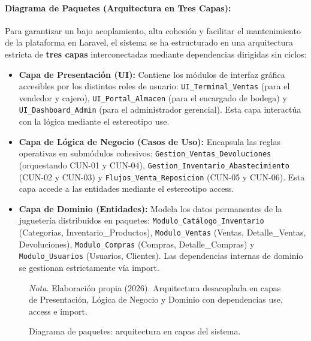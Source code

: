 \documentclass[12pt,a4paper]{article}
\begin{document}
\paragraph{Diagrama de Paquetes (Arquitectura en Tres Capas):}
Para garantizar un bajo acoplamiento, alta cohesi\'on y facilitar el mantenimiento de la plataforma en Laravel, el sistema se ha estructurado en una arquitectura estricta de \textbf{tres capas} interconectadas mediante dependencias dirigidas sin ciclos:
\begin{itemize}\sloppy
    \item \textbf{Capa de Presentaci\'on (UI):} Contiene los m\'odulos de interfaz gr\'afica accesibles por los distintos roles de usuario: \texttt{UI\_Terminal\_Ventas} (para el vendedor y cajero), \texttt{UI\_Portal\_Almacen} (para el encargado de bodega) y \texttt{UI\_Dashboard\_Admin} (para el administrador gerencial). Esta capa interact\'ua con la l\'ogica mediante el estereotipo \guillemotleft use\guillemotright.
    \item \textbf{Capa de L\'ogica de Negocio (Casos de Uso):} Encapsula las reglas operativas en subm\'odulos cohesivos: \texttt{Gestion\_Ventas\_Devoluciones} (orquestando CUN-01 y CUN-04), \texttt{Gestion\_Inventario\_Abastecimiento} (CUN-02 y CUN-03) y \texttt{Flujos\_Venta\_Reposicion} (CUN-05 y CUN-06). Esta capa accede a las entidades mediante el estereotipo \guillemotleft access\guillemotright.
    \item \textbf{Capa de Dominio (Entidades):} Modela los datos permanentes de la jugueter\'ia distribuidos en paquetes: \texttt{Modulo\_Cat\'alogo\_Inventario} (Categorias, Inventario\_Productos), \texttt{Modulo\_Ventas} (Ventas, Detalle\_Ventas, Devoluciones), \texttt{Modulo\_Compras} (Compras, Detalle\_Compras) y \texttt{Modulo\_Usuarios} (Usuarios, Clientes). Las dependencias internas de dominio se gestionan estrictamente v\'ia \guillemotleft import\guillemotright.
\end{itemize}

\begin{figure}[H]
  \centering
  \caption{Diagrama de paquetes: arquitectura en capas del sistema.}
  \label{fig:paquetes_arquitectura}
  \resizebox{0.95\linewidth}{!}{}
  \par\vspace{0.2cm}
  {\raggedright \small \emph{Nota.} Elaboraci\'on propia (2026). Arquitectura desacoplada en capas de Presentaci\'on, L\'ogica de Negocio y Dominio con dependencias \guillemotleft use\guillemotright, \guillemotleft access\guillemotright{} e \guillemotleft import\guillemotright.\par}
\end{figure}
\end{document}
